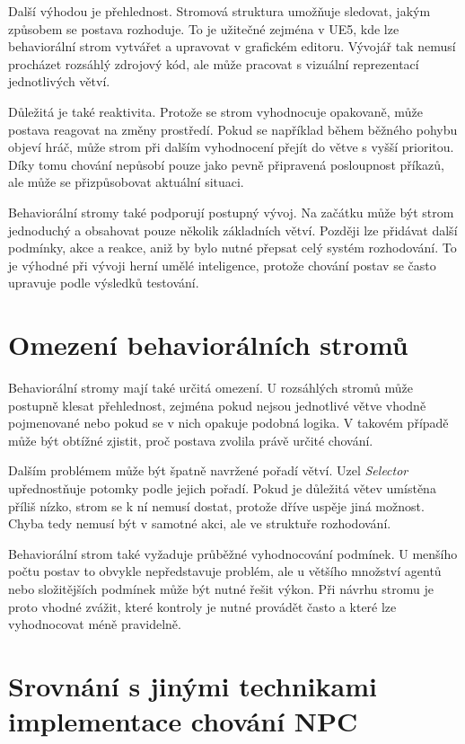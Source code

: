 Další výhodou je přehlednost. 
Stromová struktura umožňuje sledovat, jakým způsobem se postava rozhoduje. 
To je užitečné zejména v UE5, kde lze behaviorální strom vytvářet a upravovat v grafickém editoru. 
Vývojář tak nemusí procházet rozsáhlý zdrojový kód, ale může pracovat s vizuální reprezentací jednotlivých větví.\cite[s.~38]{colledanchise2018}

Důležitá je také reaktivita. 
Protože se strom vyhodnocuje opakovaně, může postava reagovat na změny prostředí. 
Pokud se například během běžného pohybu objeví hráč, může strom při dalším vyhodnocení přejít do větve s vyšší prioritou. 
Díky tomu chování nepůsobí pouze jako pevně připravená posloupnost příkazů, ale může se přizpůsobovat aktuální situaci.\cite[s.~38]{colledanchise2018}

Behaviorální stromy také podporují postupný vývoj. 
Na začátku může být strom jednoduchý a obsahovat pouze několik základních větví. 
Později lze přidávat další podmínky, akce a reakce, aniž by bylo nutné přepsat celý systém rozhodování. 
To je výhodné při vývoji herní umělé inteligence, protože chování postav se často upravuje podle výsledků testování.\cite[s.~38]{colledanchise2018}

\section{Omezení behaviorálních stromů}

Behaviorální stromy mají také určitá omezení. 
U rozsáhlých stromů může postupně klesat přehlednost, zejména pokud nejsou jednotlivé větve vhodně pojmenované nebo pokud se v nich opakuje podobná logika. 
V takovém případě může být obtížné zjistit, proč postava zvolila právě určité chování.

Dalším problémem může být špatně navržené pořadí větví. 
Uzel \textit{Selector} upřednostňuje potomky podle jejich pořadí. 
Pokud je důležitá větev umístěna příliš nízko, strom se k ní nemusí dostat, protože dříve uspěje jiná možnost. 
Chyba tedy nemusí být v samotné akci, ale ve struktuře rozhodování.

Behaviorální strom také vyžaduje průběžné vyhodnocování podmínek. 
U menšího počtu postav to obvykle nepředstavuje problém, ale u většího množství agentů nebo složitějších podmínek může být nutné řešit výkon. 
Při návrhu stromu je proto vhodné zvážit, které kontroly je nutné provádět často a které lze vyhodnocovat méně pravidelně.\cite[s.~42]{colledanchise2018}

\section{Srovnání s jinými technikami implementace chování NPC}

